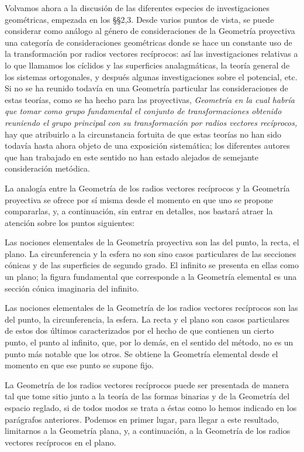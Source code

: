 \documentclass[a4paper, 12pt]{article}
\begin{document}
Volvamos ahora a la discusión de las diferentes especies de investigaciones geométricas, empezada en los {\S}{\S}2,3. Desde varios puntos de vista, se puede considerar como análogo al género de consideraciones de la Geometría proyectiva una categoría de consideraciones geométricas donde se hace un constante uso de la transformación por radios vectores recíprocos: así las investigaciones relativas a lo que llamamos los cíclidos y las superficies analagmáticas, la teoría general de los sistemas ortogonales, y después algunas investigaciones sobre el potencial, etc. Si no se ha reunido todavía en una Geometría particular las consideraciones de estas teorías, como se ha hecho para las proyectivas, \textit{Geometría en la cual habría que tomar como grupo fundamental el conjunto de transformaciones obtenido reuniendo el grupo principal con su transformación por radios vectores recíprocos, }hay que atribuirlo a la circunstancia fortuita de que estas teorías no han sido todavía hasta ahora objeto de una exposición sistemática; los diferentes autores que han trabajado en este sentido no han estado alejados de semejante consideración metódica.

La analogía entre la Geometría de los radios vectores recíprocos y la Geometría proyectiva se ofrece por sí misma desde el momento en que uno se propone compararlas, y, a continuación, sin entrar en detalles, nos bastará atraer la atención sobre los puntos siguientes:

Las nociones elementales de la Geometría proyectiva son las del punto, la recta, el plano. La circunferencia y la esfera no son sino casos particulares de las secciones cónicas y de las superficies de segundo grado. El infinito se presenta en ellas como un plano; la figura fundamental que corresponde a la Geometría elemental es una sección cónica imaginaria del infinito.

Las nociones elementales de la Geometría de los radios vectores recíprocos son las del punto, la circunferencia, la esfera. La recta y el plano son casos particulares de estos dos últimos caracterizados por el hecho de que contienen un cierto punto, el punto al infinito, que, por lo demás, en el sentido del método, no es un punto más notable que los otros. Se obtiene la Geometría elemental desde el momento en que ese punto se supone fijo.

La Geometría de los radios vectores recíprocos puede ser presentada de manera tal que tome sitio junto a la teoría de las formas binarias y de la Geometría del espacio reglado, si de todos modos se trata a éstas como lo hemos indicado en los parágrafos anteriores. Podemos en primer lugar, para llegar a este resultado, limitarnos a la Geometría plana, y, a continuación, a la Geometría de los radios vectores recíprocos en el plano.
\end{document}
